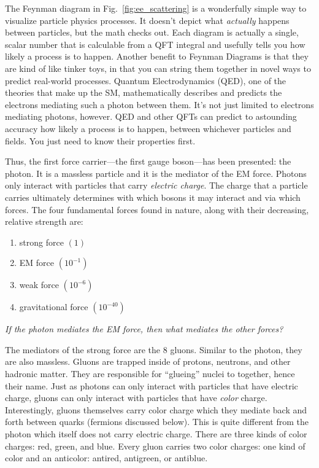 The Feynman diagram in Fig.~\ref{fig:ee_scattering} is a wonderfully simple way to visualize particle physics processes.
It doesn't depict what \emph{actually} happens between particles, but the math checks out.
Each diagram is actually a single, scalar number that is calculable from a QFT integral and usefully tells you how likely a process is to happen.
Another benefit to Feynman Diagrams is that they are kind of like tinker toys, 
in that you can string them together in novel ways to predict real-world processes.
Quantum Electrodynamics (QED), one of the theories that make up the SM, mathematically describes and predicts the electrons mediating such a photon between them. 
It's not just limited to electrons mediating photons, however.
QED and other QFTs can predict to astounding accuracy how likely a process is to happen, between whichever particles and fields. 
You just need to know their properties first.

Thus, the first force carrier---the first gauge boson---has been presented: the photon.
It is a massless particle and it is the mediator of the EM force. 
Photons only interact with particles that carry \emph{electric charge}.
The charge that a particle carries ultimately determines with which bosons it may interact and via which forces.
The four fundamental forces found in nature, along with their decreasing, relative strength are: 
\begin{enumerate}
    \item strong force $(1)$
    \item EM force $(10^{-1})$
    \item weak force $(10^{-6})$
    \item gravitational force $(10^{-40})$
\end{enumerate}
\emph{If the photon mediates the EM force, then what mediates the other forces?}

The mediators of the strong force are the 8 gluons. 
Similar to the photon, they are also massless.
Gluons are trapped inside of protons, neutrons, and other hadronic matter. 
They are responsible for ``glueing'' nuclei to together, hence their name.
Just as photons can only interact with particles that have electric charge, gluons can only interact with particles that have \emph{color} charge.
Interestingly, gluons themselves carry color charge which they mediate back and forth between quarks (fermions discussed below).
This is quite different from the photon which itself does not carry electric charge.
There are three kinds of color charges: red, green, and blue.
Every gluon carries two color charges:
one kind of color and an anticolor: antired, antigreen, or antiblue.

